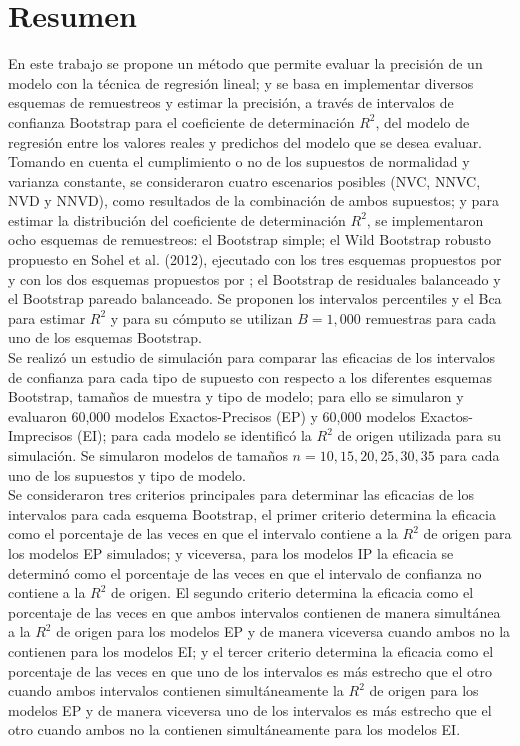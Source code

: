 \section*{Resumen}

En este trabajo se propone un método que permite evaluar la precisión de un modelo con la técnica de regresión lineal; y se basa en implementar diversos esquemas de remuestreos y estimar la precisión, a través de intervalos de confianza Bootstrap para el coeficiente de determinación $R^2$, del modelo de regresión entre los valores reales y predichos del modelo que se desea evaluar.\\

Tomando en cuenta el cumplimiento o no de los supuestos de normalidad y varianza constante, se consideraron cuatro escenarios posibles (NVC, NNVC, NVD y NNVD), como resultados de la combinación de ambos supuestos; y para estimar la distribución del coeficiente de determinación $R^2$, se implementaron ocho esquemas de remuestreos: el Bootstrap simple; el Wild Bootstrap robusto propuesto en Sohel et al. (2012), ejecutado con los tres esquemas propuestos por \textcite{wu-1986} y con los dos esquemas propuestos por \textcite{liu-1988}; el Bootstrap de residuales balanceado y el Bootstrap pareado balanceado. Se proponen los intervalos percentiles y el Bca para estimar $R^2$ y para su cómputo se utilizan $B=1,000$ remuestras para cada uno de los esquemas Bootstrap.\\ 

Se realizó un estudio de simulación para comparar las eficacias de los intervalos de confianza para cada tipo de supuesto con respecto a los diferentes esquemas Bootstrap, tamaños de muestra y tipo de modelo; para ello se simularon y evaluaron 60,000 modelos Exactos-Precisos (EP) y 60,000 modelos Exactos-Imprecisos (EI); para cada modelo se identificó la $R^2$ de origen utilizada para su simulación. Se simularon modelos de tamaños $n=10, 15, 20, 25, 30, 35$ para cada uno de los supuestos y tipo de modelo.\\

Se consideraron tres criterios principales para determinar las eficacias de los intervalos para cada esquema Bootstrap, el primer criterio determina la eficacia como el porcentaje de las veces en que el intervalo contiene a la $R^2$ de origen para los modelos EP simulados; y viceversa, para los modelos IP la eficacia se determinó como el porcentaje de las veces en que el intervalo de confianza no contiene a la $R^2$ de origen. El segundo criterio determina la eficacia como el porcentaje de las veces en que ambos intervalos contienen de manera simultánea a la $R^2$ de origen para los modelos EP y de manera viceversa cuando ambos no la contienen para los modelos EI; y el tercer criterio determina la eficacia como el porcentaje de las veces en que uno de los intervalos es más estrecho que el otro cuando ambos intervalos contienen simultáneamente la $R^2$ de origen para los modelos EP y de manera viceversa uno de los intervalos es más estrecho que el otro cuando ambos no la contienen simultáneamente para los modelos EI.\\

